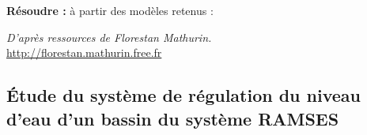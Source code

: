 \documentclass[10pt]{article}
\begin{document}






\begin{comp}
\noindent \textbf{Résoudre :} à partir des modèles retenus :


\end{comp}


\setcounter{subparagraph}{0}

\begin{flushright}
\textit{D'après ressources de Florestan Mathurin.} \\
\url{http://florestan.mathurin.free.fr}
\end{flushright}
\subsection*{Étude du système de régulation du niveau d'eau d'un bassin du système RAMSES}
\end{document}
